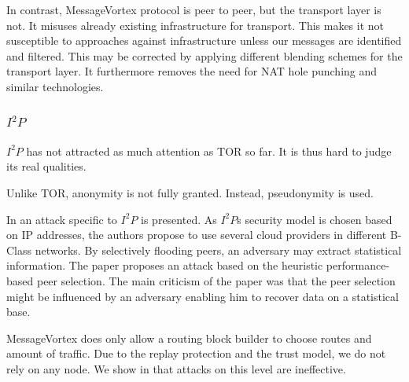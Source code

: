 \documentclass[runningheads]{llncs}
\begin{document}
In contrast, MessageVortex protocol is peer to peer, but the transport layer is not. It misuses already existing infrastructure for transport. This makes it not susceptible to approaches against infrastructure unless our messages are identified and filtered. This may be corrected by applying different blending schemes for the transport layer. It furthermore removes the need for NAT hole punching and similar technologies.

\subsubsection{$I^2P$}
%
$I^2P$ has not attracted as much attention as TOR so far. It is thus hard to judge its real qualities. 

Unlike TOR, anonymity is not fully granted. Instead, pseudonymity is used. 

In \cite{pets2011-i2p} an attack specific to $I^2P$ is presented. As $I^2P$s security model is chosen based on IP addresses, the authors propose to use several cloud providers in different B-Class networks. By selectively flooding peers, an adversary may extract statistical information. The paper proposes an attack based on the heuristic performance-based peer selection. The main criticism of the paper was that the peer selection might be influenced by an adversary enabling him to recover data on a statistical base.

MessageVortex does only allow a routing block builder to choose routes and amount of traffic. Due to the replay protection and the trust model, we do not rely on any node. We show in \cite{messageVortex} that attacks on this level are ineffective.
\end{document}
